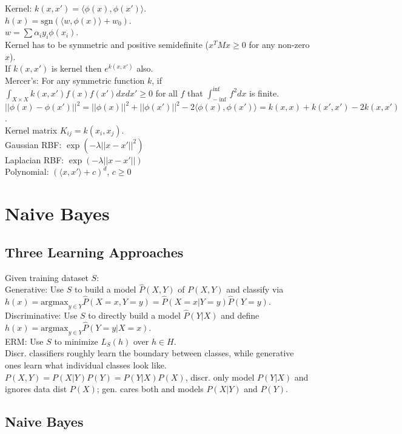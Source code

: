 Kernel: $k(x, x') = \langle \phi(x), \phi(x') \rangle$.\\
$h(x) = \text{sgn}(\langle w, \phi(x) \rangle + w_0)$.\\
$w = \sum\alpha_i y_i \phi(x_i)$.\\
Kernel has to be symmetric and positive semidefinite ($x^TMx \geq 0$ for any non-zero $x$).\\
If $k(x, x')$ is kernel then $e^{k(x, x')}$ also.\\
Mercer's: For any symmetric function $k$, if $\int_{X \times X}k(x, x')f(x)f(x')dxdx' \geq 0$ for all $f$ that $\int_{-\inf}^{\inf}f^2dx$ is finite.\\
$||\phi(x) - \phi(x')||^2 = ||\phi(x)||^2+||\phi(x')||^2-2\langle \phi(x), \phi(x')\rangle = k(x, x) + k(x', x') - 2k(x, x')$.\\
Kernel matrix $K_{ij} = k(x_i, x_j)$.\\
Gaussian RBF: $\exp(-\lambda ||x - x'||^2)$\\
Laplacian RBF: $\exp(-\lambda ||x - x'||)$\\
Polynomial: $(\langle x, x' \rangle + c)^d$, $c \geq 0$

\section{Naive Bayes}

\subsection*{Three Learning Approaches}

Given training dataset $S$:\\
Generative: Use $S$ to build a model $\hat{P}(X,Y)$ of $P(X,Y)$ and classify via $h(x) = \text{argmax}_{y \in Y} \hat{P}(X=x, Y=y) = \hat{P}(X=x|Y=y) \hat{P}(Y=y)$.\\
Discriminative: Use $S$ to directly build a model $\hat{P}(Y|X)$ and define $h(x) = \text{argmax}_{y\in Y} \hat{P}(Y=y|X=x)$.\\
ERM: Use $S$ to minimize $L_S(h)$ over $h \in H$.\\
Discr. classifiers roughly learn the boundary between classes, while generative ones learn what individual classes look like.\\
$P(X,Y)=P(X|Y)P(Y) = P(Y|X)P(X)$, discr. only model $P(Y|X)$ and ignores data dist $P(X)$; gen. cares both and models $P(X|Y)$ and $P(Y)$.

\subsection*{Naive Bayes}

